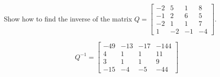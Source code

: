 
\begin{exerciseStatement}


Show how to find the inverse of the matrix \(Q= \left[\begin{array}{cccc}
-2 & 5 & 1 & 8 \\
-1 & 2 & 6 & 5 \\
-2 & 1 & 1 & 7 \\
1 & -2 & -1 & -4
\end{array}\right] \).


\end{exerciseStatement}
    
\begin{exerciseAnswer} 
\[Q^{-1}= \left[\begin{array}{cccc}
-49 & -13 & -17 & -144 \\
4 & 1 & 1 & 11 \\
3 & 1 & 1 & 9 \\
-15 & -4 & -5 & -44
\end{array}\right] \]
\end{exerciseAnswer}
    

